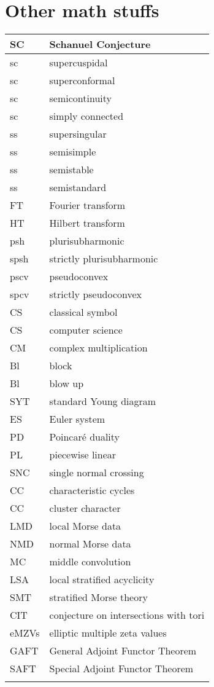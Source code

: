 \documentclass{amsart}
\numberwithin{equation}{section}
\theoremstyle{plain}
\numberwithin{equation}{section}
\theoremstyle{remark}
\begin{document}
\section{Other math stuffs}
\begin{longtable}{l|l}
\hline
SC & Schanuel Conjecture \\ \hline
sc & supercuspidal\\ \hline
sc & superconformal\\ \hline
sc & semicontinuity\\ \hline
sc & simply connected\\ \hline
ss & supersingular\\ \hline
ss & semisimple\\ \hline
ss & semistable\\ \hline
ss & semistandard\\ \hline
FT & Fourier transform\\ \hline
HT & Hilbert transform\\ \hline
psh & plurisubharmonic\\ \hline
spsh & strictly plurisubharmonic\\ \hline
pscv & pseudoconvex\\ \hline
spcv & strictly pseudoconvex\\ \hline 
CS & classical symbol\\ \hline
CS & computer science\\ \hline
CM & complex multiplication\\ \hline
Bl  & block\\ \hline
Bl  & blow up\\ \hline
SYT  & standard Young diagram\\ \hline
ES  & Euler system\\ \hline
PD & Poincaré duality\\ \hline
PL & piecewise linear\\ \hline
SNC & single normal crossing\\ \hline
CC & characteristic cycles\\ \hline
CC & cluster character\\ \hline
LMD & local Morse data\\ \hline
NMD & normal Morse data\\ \hline
MC & middle convolution\\ \hline
LSA & local stratified acyclicity\\ \hline
SMT & stratified Morse theory\\ \hline
CIT & conjecture on intersections with tori\\ \hline
eMZVs & elliptic multiple zeta values\\ \hline
GAFT & General Adjoint Functor Theorem\\ \hline
SAFT & Special Adjoint Functor Theorem\\ \hline
 & \\ \hline
\end{longtable}
\end{document}
